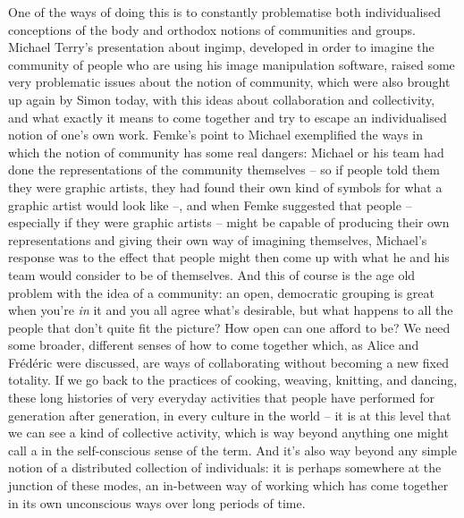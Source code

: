 {One of the ways of doing this is to constantly problematise both
individualised conceptions of the body and orthodox notions of
communities and groups. Michael Terry's presentation about ingimp,
developed in order to imagine the community of people who are using his
image manipulation software, raised some very problematic issues about
the notion of community, which were also brought up again by Simon
today, with this ideas about collaboration and collectivity, and what
exactly it means to come together and try to escape an individualised
notion of one's own work. Femke's point to Michael exemplified the ways
in which the notion of community has some real dangers: Michael or his
team had done the representations of the community themselves {--} so
if people told them they were graphic artists, they had found their own
kind of symbols for what a graphic artist would look like {--}, and
when Femke suggested that people {--} especially if they were graphic
artists {--} might be capable of producing their own representations
and giving their own way of imagining themselves, Michael's response
was to the effect that people might then come up with what he and his
team would consider to be  of themselves. And this
of course is the age old problem with the idea of a community: an open,
democratic grouping is great when you're {\em in} it and you all
agree what's desirable, but what happens to all the people that don't
quite fit the picture? How open can one afford to be? We need some
broader, different senses of how to come together which, as Alice and
Fr\'ed\'eric were discussed, are ways of collaborating without becoming
a new fixed totality. If we go back to the practices of cooking,
weaving, knitting, and dancing, these long histories of very everyday
activities that people have performed for generation after generation,
in every culture in the world {--} it is at this level that we can see
a kind of collective activity, which is way beyond anything one might
call a  in the self{}-conscious sense of the term. And it's
also way beyond any simple notion of a distributed collection of
individuals: it is perhaps somewhere at the junction of these modes, an
in{}-between way of working which has come together in its own
unconscious ways over long periods of time. 

}
